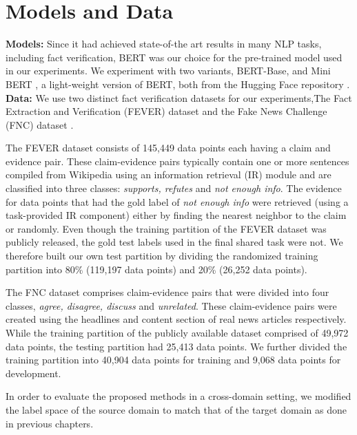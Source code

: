 \section{Models and Data}

\textbf{Models:} Since it had achieved state-of-the art results in many NLP tasks, including fact verification, BERT \citep{devlin-etal-2019-bert} 
was our  choice for the pre-trained model used in our experiments. We experiment with two variants, BERT-Base, and Mini BERT \cite {turc2019well}, a light-weight version of BERT, both from the Hugging Face repository \citep{wolf2019huggingface}.
\textbf{Data:} We use two distinct fact verification datasets for
our experiments,The Fact Extraction and Verification (FEVER) dataset  \citep{thorne-etal-2018-fact} and the Fake News Challenge (FNC) dataset \citep{pomerleau2017fake}.

The FEVER dataset consists of 145,449 data points each having a claim and evidence pair. These claim-evidence pairs typically contain one or more sentences compiled from Wikipedia using an information retrieval (IR) module and are classified into three classes: \textit{supports, refutes} and \textit{not enough info}. The evidence for data points that had the gold label of \textit{not enough info} were  retrieved (using a task-provided IR component) either by finding the nearest neighbor to the claim or randomly. Even though the training partition of the FEVER dataset was publicly released, the gold test labels used in the final shared task were not. We therefore built our own test partition by dividing the randomized training partition into 80\% (119,197 data points) and 20\% (26,252 data points).

The FNC dataset comprises claim-evidence pairs that were divided into four classes, \textit{agree, disagree, discuss} and \textit{unrelated}. These claim-evidence pairs were created using the headlines and content section of real news articles respectively. While the training partition of the publicly available dataset comprised of 49,972 data points, the testing partition had 25,413 data points. We further divided the training partition into
40,904 data points for training and 9,068 data points for development.

In order to evaluate the proposed methods in a cross-domain setting, we modified the label space of the source domain to match that of the target domain as done in previous chapters.

